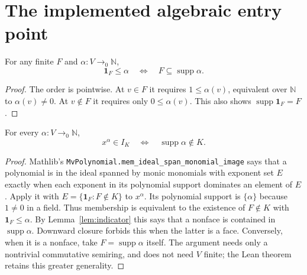 \section{The implemented algebraic entry point}

\begin{lemma}\label{lem:indicator}
\leanok
For any finite $F$ and $\alpha:V\to_0\mathbb N$,
\[
 \mathbf1_F\le\alpha\quad\Longleftrightarrow\quad
 F\subseteq\operatorname{supp}\alpha.
\]
\end{lemma}
\begin{proof}
\leanok
The order is pointwise. At $v\in F$ it requires $1\le\alpha(v)$, equivalent
over $\mathbb N$ to $\alpha(v)\ne0$. At $v\notin F$ it requires only
$0\le\alpha(v)$. This also shows $\operatorname{supp}\mathbf1_F=F$.
\end{proof}

\begin{theorem}\label{thm:membership}
\leanok
For every $\alpha:V\to_0\mathbb N$,
\[
 x^\alpha\in I_K\quad\Longleftrightarrow\quad
 \operatorname{supp}\alpha\notin K.
\]
\end{theorem}
\begin{proof}
\leanok
Mathlib's \texttt{MvPolynomial.mem\_ideal\_span\_monomial\_image} says that a
polynomial is in the ideal spanned by monic monomials with exponent set $E$
exactly when each exponent in its polynomial support dominates an element
of $E$. Apply it with $E=\{\mathbf1_F:F\notin K\}$ to $x^\alpha$.
Its polynomial support is $\{\alpha\}$ because $1\ne0$ in a field.
Thus membership is equivalent to the existence of $F\notin K$ with
$\mathbf1_F\le\alpha$. By Lemma~\ref{lem:indicator} this says that a nonface
is contained in $\operatorname{supp}\alpha$. Downward closure forbids this
when the latter is a face. Conversely, when it is a nonface, take
$F=\operatorname{supp}\alpha$ itself. The argument needs only a nontrivial
commutative semiring, and does not need $V$ finite; the Lean theorem retains
this greater generality.
\end{proof}

